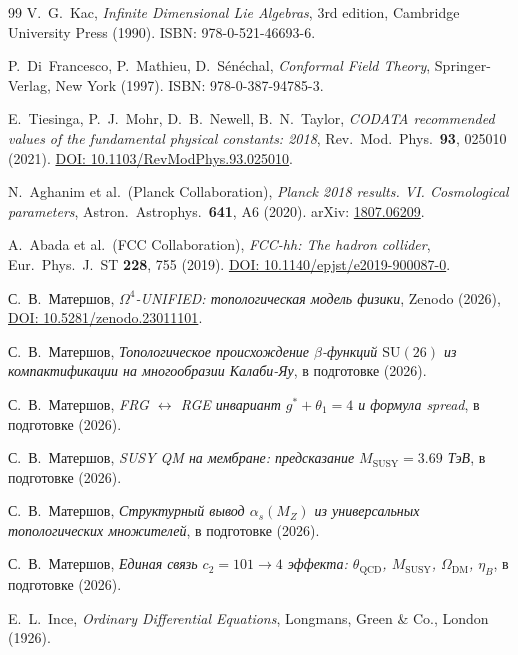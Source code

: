 \documentclass[11pt,a4paper]{article}
\newcommand{\SU}{\ensuremath{\mathrm{SU}}}
\theoremstyle{definition}
\begin{document}
\begin{thebibliography}{99}
V.~G.~Kac,
\textit{Infinite Dimensional Lie Algebras},
3rd edition, Cambridge University Press (1990).
ISBN: 978-0-521-46693-6.

P.~Di~Francesco, P.~Mathieu, D.~S\'en\'echal,
\textit{Conformal Field Theory},
Springer-Verlag, New York (1997).
ISBN: 978-0-387-94785-3.

E.~Tiesinga, P.~J.~Mohr, D.~B.~Newell, B.~N.~Taylor,
\textit{CODATA recommended values of the fundamental physical constants: 2018},
Rev.\ Mod.\ Phys.\ \textbf{93}, 025010 (2021).
\href{https://doi.org/10.1103/RevModPhys.93.025010}{DOI: 10.1103/RevModPhys.93.025010}.

N.~Aghanim et al.\ (Planck Collaboration),
\textit{Planck 2018 results. VI. Cosmological parameters},
Astron.\ Astrophys.\ \textbf{641}, A6 (2020).
arXiv: \href{https://arxiv.org/abs/1807.06209}{1807.06209}.

A.~Abada et al.\ (FCC Collaboration),
\textit{FCC-hh: The hadron collider},
Eur.\ Phys.\ J.\ ST \textbf{228}, 755 (2019).
\href{https://doi.org/10.1140/epjst/e2019-900087-0}{DOI: 10.1140/epjst/e2019-900087-0}.

С.~В.~Матершов,
\textit{$\Omega^4$-UNIFIED: топологическая модель физики},
Zenodo (2026),
\href{https://doi.org/10.5281/zenodo.23011101}{DOI: 10.5281/zenodo.23011101}.

С.~В.~Матершов,
\textit{Топологическое происхождение $\beta$-функций $\SU(26)$ из компактификации на многообразии Калаби-Яу},
в подготовке (2026).

С.~В.~Матершов,
\textit{FRG $\leftrightarrow$ RGE инвариант $g^* + \theta_1 = 4$ и формула spread},
в подготовке (2026).

С.~В.~Матершов,
\textit{SUSY QM на мембране: предсказание $M_{\text{SUSY}} = 3.69$ ТэВ},
в подготовке (2026).

С.~В.~Матершов,
\textit{Структурный вывод $\alpha_s(M_Z)$ из универсальных
топологических множителей},
в подготовке (2026).

С.~В.~Матершов,
\textit{Единая связь $c_2 = 101 \to 4$ эффекта:
$\theta_{\text{QCD}}$, $M_{\text{SUSY}}$, $\Omega_{\text{DM}}$, $\eta_B$},
в подготовке (2026).        

E.~L.~Ince,
\textit{Ordinary Differential Equations},
Longmans, Green \& Co., London (1926).


\end{thebibliography}
\end{document}
